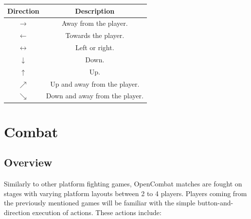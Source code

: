 \begin{table}[h!]
    \centering
    \begin{tabular}{| c | c |}
        \hline
        \textbf{Direction} & \textbf{Description} \\
        \hline
        $\rightarrow$ & Away from the player.\\
        \hline
        $\leftarrow$ & Towards the player.\\
        \hline
        $\leftrightarrow$ & Left or right.\\
        \hline
        $\downarrow$ & Down.\\
        \hline
        $\uparrow$ & Up.\\
        \hline
        $\nearrow$ & Up and away from the player.\\
        \hline
        $\searrow$ & Down and away from the player.\\
        \hline
    \end{tabular}
\end{table}

\section{Combat}

\subsection{Overview}

\paragraph{} Similarly to other platform fighting games, OpenCombat matches are fought on stages with varying platform layouts between 2 to 4 players. Players coming from the previously mentioned games will be familiar with the simple button-and-direction execution of actions. These actions include:

